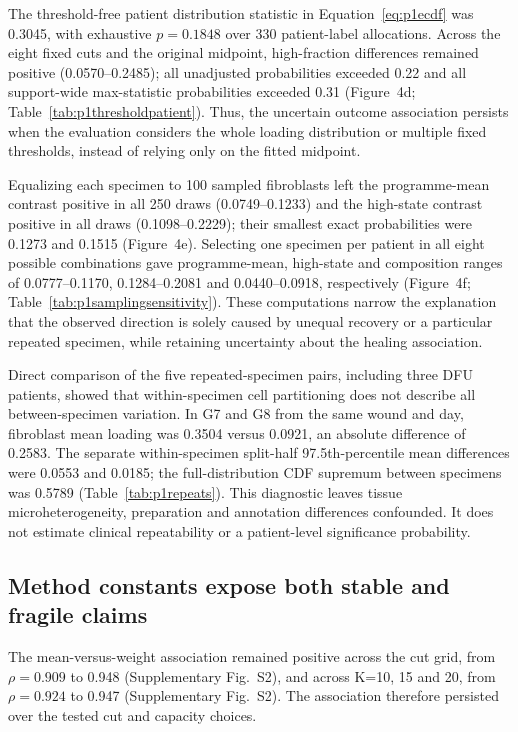 \documentclass[10pt,a4paper]{article}
\begin{document}
The threshold-free patient distribution statistic in Equation~\eqref{eq:p1ecdf} was 0.3045, with exhaustive $p=0.1848$ over 330 patient-label allocations. Across the eight fixed cuts and the original midpoint, high-fraction differences remained positive (0.0570--0.2485); all unadjusted probabilities exceeded 0.22 and all support-wide max-statistic probabilities exceeded 0.31 (Figure~4d; Table~\ref{tab:p1thresholdpatient}). Thus, the uncertain outcome association persists when the evaluation considers the whole loading distribution or multiple fixed thresholds, instead of relying only on the fitted midpoint.

Equalizing each specimen to 100 sampled fibroblasts left the programme-mean contrast positive in all 250 draws (0.0749--0.1233) and the high-state contrast positive in all draws (0.1098--0.2229); their smallest exact probabilities were 0.1273 and 0.1515 (Figure~4e). Selecting one specimen per patient in all eight possible combinations gave programme-mean, high-state and composition ranges of 0.0777--0.1170, 0.1284--0.2081 and 0.0440--0.0918, respectively (Figure~4f; Table~\ref{tab:p1samplingsensitivity}). These computations narrow the explanation that the observed direction is solely caused by unequal recovery or a particular repeated specimen, while retaining uncertainty about the healing association.


Direct comparison of the five repeated-specimen pairs, including three DFU patients, showed that within-specimen cell partitioning does not describe all between-specimen variation. In G7 and G8 from the same wound and day, fibroblast mean loading was 0.3504 versus 0.0921, an absolute difference of 0.2583. The separate within-specimen split-half 97.5th-percentile mean differences were 0.0553 and 0.0185; the full-distribution CDF supremum between specimens was 0.5789 (Table~\ref{tab:p1repeats}). This diagnostic leaves tissue microheterogeneity, preparation and annotation differences confounded. It does not estimate clinical repeatability or a patient-level significance probability.

\subsection{Method constants expose both stable and fragile claims}



The mean-versus-weight association remained positive across the cut grid, from $\rho=0.909$ to 0.948 (Supplementary Fig.~S2\label{call:p1f6}), and across K=10, 15 and 20, from $\rho=0.924$ to 0.947 (Supplementary Fig.~S2). The association therefore persisted over the tested cut and capacity choices.
\end{document}
